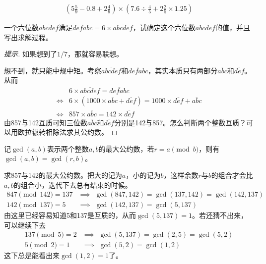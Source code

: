 \begin{question}
  \begin{align*}
    \left( 5\frac59 - 0.8 + 2\frac49 \right) \times
    \left( 7.6\div\frac45 + 2\frac25 \times 1.25 \right)
  \end{align*}
\end{question}


\begin{question}
  一个六位数$\overline{abcdef}$满足$\overline{defabc}=6\times\overline{abcdef}$，试确定这个六位数$\overline{abcdef}$的值，并且写出求解过程。
\end{question}
\begin{proof}[提示]
  如果想到了$1/7$，那就容易联想。

  想不到，就只能中规中矩。考察$\overline{abcdef}$和$\overline{defabc}$，其实本质只有两部分$\overline{abc}$和$\overline{def}$。从而
  \begin{align*}
    &6\times\overline{abcdef}=\overline{defabc}\\
    \iff & 6\times\left(1000\times\overline{abc} + \overline{def}\right)
           = 1000\times\overline{def} + \overline{abc}\\
    \iff & 857\times\overline{abc}= 142\times\overline{def}
  \end{align*}
  由857与142互质可知三位数$\overline{abc}$和$\overline{def}$分别是142与857。怎么判断两个整数互质？可以用欧拉辗转相除法求其公约数。
\end{proof}


\begin{theorem}[欧拉辗转相除法]
  记$\gcd(a,b)$表示两个整数$a,b$的最大公约数，若$r=a\pmod b$，则有$\gcd(a,b)=\gcd(r,b)$。
\end{theorem}
\begin{example}
求857与142的最大公约数。把大的记为$a$，小的记为$b$，这样余数$r$与$b$的组合才会比$a,b$的组合小，迭代下去总有结束的时候。
\begin{align*}
  847 \pmod{142} = 137 & \implies \,\, \gcd(847,142) = \gcd(137,142) = \gcd(142,137) \\
  142 \pmod{137}= 5   & \implies \,\, \gcd(142,137) = \gcd(5,137)
\end{align*}
由这里已经容易知道5和137是互质的，从而$\gcd(5,137)=1$。若还猜不出来，可以继续下去
\begin{align*}
  137 \pmod 5 = 2 & \implies \,\, \gcd(5,137) = \gcd(2,5) = \gcd(5,2) \\
  5 \pmod 2 = 1   & \implies \,\, \gcd(5,2) = \gcd(1,2)
\end{align*}
这下总是能看出来$\gcd(1,2)=1$了。
\end{example}


